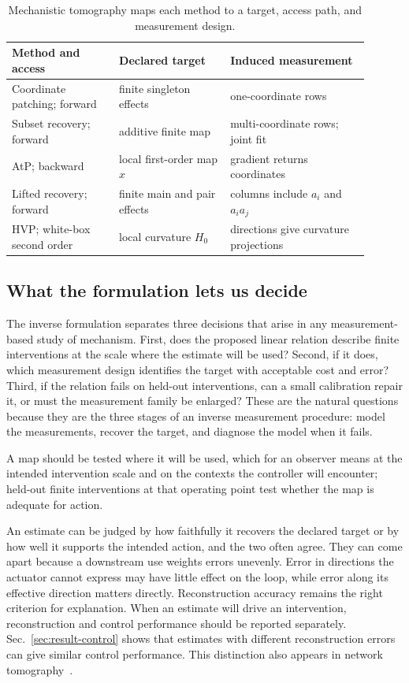 \documentclass[sigconf,10pt,nonacm,balance=false]{acmart}
\begin{document}
\begin{table}[t]
\centering
\caption{Mechanistic tomography maps each method to a target, access path, and measurement design.}
\label{tab:methodmap}
\scriptsize
\renewcommand{\arraystretch}{1.08}
\setlength{\tabcolsep}{2pt}
\begin{tabular}{p{0.27\linewidth}p{0.28\linewidth}p{0.35\linewidth}}
\toprule
Method and access & Declared target & Induced measurement \\
\midrule
Coordinate patching; forward & finite singleton effects & one-coordinate rows \\
Subset recovery; forward & additive finite map & multi-coordinate rows; joint fit \\
AtP; backward & local first-order map $x$ & gradient returns coordinates \\
Lifted recovery; forward & finite main and pair effects & columns include $a_i$ and $a_i a_j$ \\
HVP; white-box second order & local curvature $H_0$ & directions give curvature projections \\
\bottomrule
\end{tabular}
\end{table}
\FloatBarrier

\subsection{What the formulation lets us decide}\label{sec:decisions}

The inverse formulation separates three decisions that arise in any measurement-based study of mechanism. First, does the proposed linear relation describe finite interventions at the scale where the estimate will be used? Second, if it does, which measurement design identifies the target with acceptable cost and error? Third, if the relation fails on held-out interventions, can a small calibration repair it, or must the measurement family be enlarged? These are the natural questions because they are the three stages of an inverse measurement procedure: model the measurements, recover the target, and diagnose the model when it fails.

A map should be tested where it will be used, which for an observer means at the intended intervention scale and on the contexts the controller will encounter; held-out finite interventions at that operating point test whether the map is adequate for action.

An estimate can be judged by how faithfully it recovers the declared target or by how well it supports the intended action, and the two often agree. They can come apart because a downstream use weights errors unevenly. Error in directions the actuator cannot express may have little effect on the loop, while error along its effective direction matters directly. Reconstruction accuracy remains the right criterion for explanation. When an estimate will drive an intervention, reconstruction and control performance should be reported separately. Sec.~\ref{sec:result-control} shows that estimates with different reconstruction errors can give similar control performance. This distinction also appears in network tomography~\cite{roughan2003te}.
\end{document}
